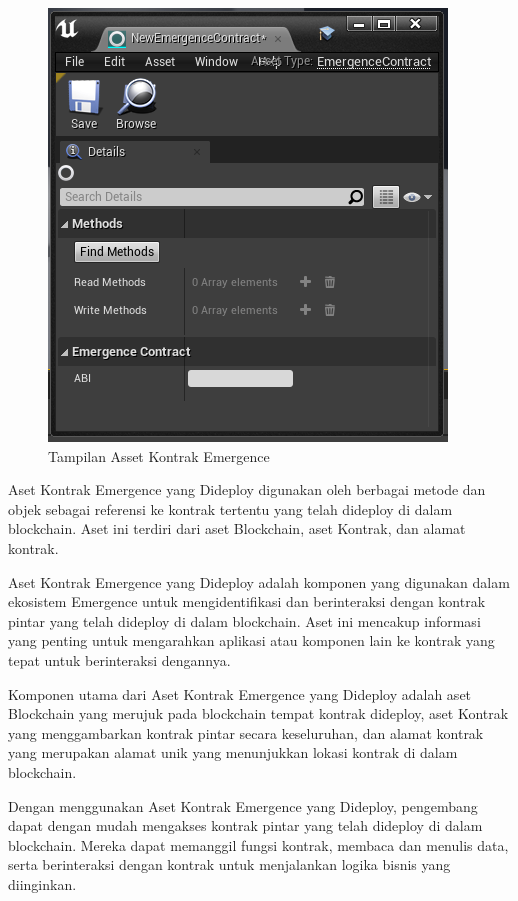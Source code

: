 \begin{figure}[H]
  \centering

  \includegraphics[scale=0.6]{gambar/emergencecontract.png}

  \caption{Tampilan Asset Kontrak Emergence}
  \label{fig:emergencecontract}
\end{figure}

Aset Kontrak Emergence yang Dideploy digunakan oleh berbagai metode dan objek sebagai referensi ke kontrak tertentu yang telah dideploy di dalam blockchain. Aset ini terdiri dari aset Blockchain, aset Kontrak, dan alamat kontrak.

Aset Kontrak Emergence yang Dideploy adalah komponen yang digunakan dalam ekosistem Emergence untuk mengidentifikasi dan berinteraksi dengan kontrak pintar yang telah dideploy di dalam blockchain. Aset ini mencakup informasi yang penting untuk mengarahkan aplikasi atau komponen lain ke kontrak yang tepat untuk berinteraksi dengannya.

Komponen utama dari Aset Kontrak Emergence yang Dideploy adalah aset Blockchain yang merujuk pada blockchain tempat kontrak dideploy, aset Kontrak yang menggambarkan kontrak pintar secara keseluruhan, dan alamat kontrak yang merupakan alamat unik yang menunjukkan lokasi kontrak di dalam blockchain.

Dengan menggunakan Aset Kontrak Emergence yang Dideploy, pengembang dapat dengan mudah mengakses kontrak pintar yang telah dideploy di dalam blockchain. Mereka dapat memanggil fungsi kontrak, membaca dan menulis data, serta berinteraksi dengan kontrak untuk menjalankan logika bisnis yang diinginkan.

